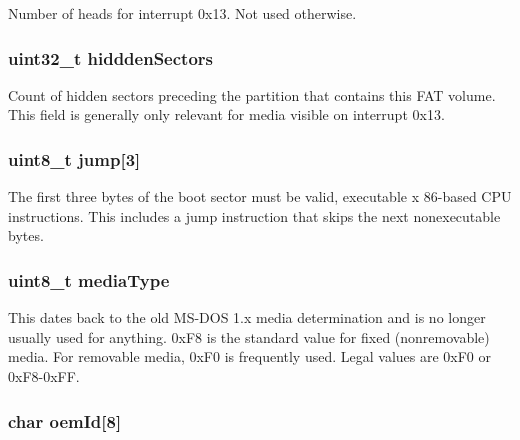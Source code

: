 Number of heads for interrupt 0x13. Not used otherwise. \hypertarget{structfat__boot_a454fd6cc3f063c86b7fe65c367da7cdd}{
\subsubsection[{hiddden\-Sectors}]{\setlength{\rightskip}{0pt plus 5cm}uint32\-\_\-t hiddden\-Sectors}}\label{structfat__boot_a454fd6cc3f063c86b7fe65c367da7cdd}
Count of hidden sectors preceding the partition that contains this F\-A\-T volume. This field is generally only relevant for media visible on interrupt 0x13. \hypertarget{structfat__boot_a61b95cffdd449d10352cfd0288b23287}{
\subsubsection[{jump}]{\setlength{\rightskip}{0pt plus 5cm}uint8\-\_\-t jump\mbox{[}3\mbox{]}}}\label{structfat__boot_a61b95cffdd449d10352cfd0288b23287}
The first three bytes of the boot sector must be valid, executable x 86-\/based C\-P\-U instructions. This includes a jump instruction that skips the next nonexecutable bytes. \hypertarget{structfat__boot_ab88738f9cb91c882cb91d5e83a19a73f}{
\subsubsection[{media\-Type}]{\setlength{\rightskip}{0pt plus 5cm}uint8\-\_\-t media\-Type}}\label{structfat__boot_ab88738f9cb91c882cb91d5e83a19a73f}
This dates back to the old M\-S-\/\-D\-O\-S 1.\-x media determination and is no longer usually used for anything. 0x\-F8 is the standard value for fixed (nonremovable) media. For removable media, 0x\-F0 is frequently used. Legal values are 0x\-F0 or 0x\-F8-\/0x\-F\-F. \hypertarget{structfat__boot_adff248465625d1fa3583bfcf2838620d}{
\subsubsection[{oem\-Id}]{\setlength{\rightskip}{0pt plus 5cm}char oem\-Id\mbox{[}8\mbox{]}}}\label{structfat__boot_adff248465625d1fa3583bfcf2838620d}
